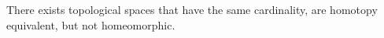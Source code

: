 \documentclass{book}                                                           %
\begin{document}
                \hfill
                \par\hfill\par
                \begin{theorem}
                    \label{thm:HE_of_Punc_Plane_and_Circle_Not_Homeo}%
                    There exists topological spaces that have the same
                    cardinality, are homotopy equivalent, but not homeomorphic.
                \end{theorem}
\end{document}
